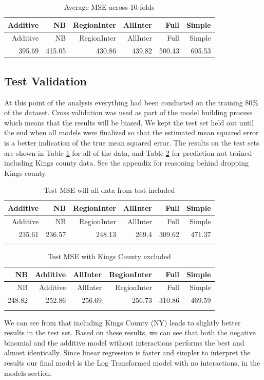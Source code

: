 \documentclass[]{article}
\begin{document}
\begin{longtable}[]{@{}rrrrrr@{}}
\caption{Average MSE across 10-folds}\tabularnewline
\toprule
Additive & NB & RegionInter & AllInter & Full & Simple\tabularnewline
\midrule
\endfirsthead
\toprule
Additive & NB & RegionInter & AllInter & Full & Simple\tabularnewline
\midrule
\endhead
395.69 & 415.05 & 430.86 & 439.82 & 500.43 & 605.53\tabularnewline
\bottomrule
\end{longtable}

\subsection{Test Validation}\label{test-validation}

At this point of the analysis everything had been conducted on the
training 80\% of the dataset. Cross validation was used as part of the
model building process which means that the results will be biased. We
kept the test set held out until the end when all models were finalized
so that the estimated mean squared error is a better indication of the
true mean squared error. The results on the test sets are shown in Table \ref{table:mse_all} for all of the data, and Table \ref{table:mse_nokings} for prediction not trained including Kings county data. See the appendix for reasoning behind dropping Kings county.

\pagebreak

\begin{longtable}[]{@{}rrrrrr@{}}
\caption{Test MSE will all data from test included}\tabularnewline
\toprule
Additive & NB & RegionInter & AllInter & Full & Simple\tabularnewline
\midrule
\endfirsthead
\toprule
Additive & NB & RegionInter & AllInter & Full & Simple\tabularnewline
\midrule
\endhead
235.61 & 236.57 & 248.13 & 269.4 & 309.62 & 471.37\tabularnewline
\bottomrule
\label{table:mse_all}
\end{longtable}

\begin{longtable}[]{@{}rrrrrr@{}}
\caption{Test MSE with Kings County excluded}\tabularnewline
\toprule
NB & Additive & AllInter & RegionInter & Full & Simple\tabularnewline
\midrule
\endfirsthead
\toprule
NB & Additive & AllInter & RegionInter & Full & Simple\tabularnewline
\midrule
\endhead
248.82 & 252.86 & 256.69 & 256.73 & 310.86 & 469.59\tabularnewline
\bottomrule
\label{table:mse_nokings}
\end{longtable}

We can see from that including Kings County (NY) leads to slightly better
results in the test set. Based on these results, we can see that both
the negative binomial and the additive model without interactions
performs the best and almost identically. Since linear regression is
faster and simpler to interpret the results our final model is the Log
Transformed model with no interactions, in the models section.
\end{document}
